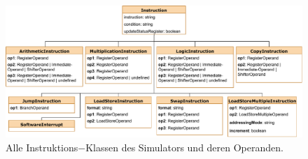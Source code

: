 \documentclass[a4paper, 11pt, onecolumn]{article}
\begin{document}
\begin{figure}[!htb]
\centering
\includegraphics[width=1\textwidth]{data/instructions}
\caption{Alle Instruktions$-$Klassen des Simulators und deren Operanden.}
\label{fig:instructions}
\end{figure}
\end{document}

